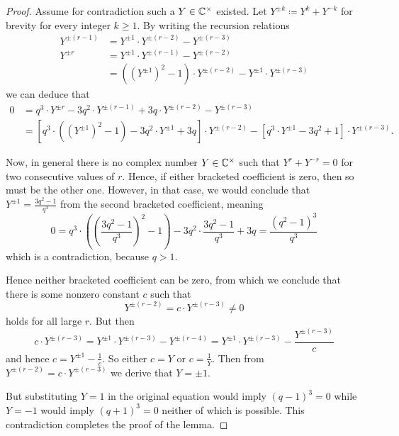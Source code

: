 \begin{proof}
  Assume for contradiction such a $Y \in \mathbb C^\times$ existed.
  Let $Y^{\pm k} \coloneqq Y^k + Y^{-k}$ for brevity for every integer $k \ge 1$.
  By writing the recursion relations
  \begin{align*}
    Y^{\pm (r-1)} &= Y^{\pm 1} \cdot Y^{\pm (r-2)} - Y^{\pm (r-3)} \\
    Y^{\pm r} &= Y^{\pm 1} \cdot Y^{\pm (r-1)} - Y^{\pm (r-2)} \\
    &= ((Y^{\pm 1})^2 - 1) \cdot Y^{\pm (r-2)} - Y^{\pm 1} \cdot Y^{\pm (r-3)}
  \end{align*}
  we can deduce that
  \begin{align*}
    0 &= q^3 \cdot Y^{\pm r} - 3q^2 \cdot Y^{\pm (r-1)} + 3q \cdot Y^{\pm (r-2)} - Y^{\pm (r-3)} \\
    &= \left[ q^3 \cdot \left( (Y^{\pm 1})^2 - 1 \right)
      - 3q^2 \cdot Y^{\pm 1} + 3q \right] \cdot Y^{\pm (r-2)}
    - \left[ q^3 \cdot Y^{\pm 1} - 3q^2 + 1 \right] \cdot Y^{\pm (r-3)}.
  \end{align*}

  Now, in general there is no complex number $Y \in \mathbb C^\times$ such that
  $Y^r + Y^{-r} = 0$ for two consecutive values of $r$.
  Hence, if either bracketed coefficient is zero, then so must be the other one.
  However, in that case, we would conclude that
  $Y^{\pm 1} = \frac{3q^2-1}{q^3}$ from the second bracketed coefficient, meaning
  \[ 0 = q^3 \cdot \left( \left( \frac{3q^2-1}{q^3} \right)^2 - 1 \right)
    - 3q^2 \cdot \frac{3q^2-1}{q^3} + 3q = \frac{(q^2-1)^3}{q^3} \]
  which is a contradiction, because $q > 1$.

  Hence neither bracketed coefficient can be zero,
  from which we conclude that there is some nonzero constant $c$ such that
  \[ Y^{\pm (r-2)} = c \cdot Y^{\pm(r-3)} \neq 0 \]
  holds for all large $r$.
  But then
  \[ c \cdot Y^{\pm(r-3)}
    = Y^{\pm 1} \cdot Y^{\pm (r-3)} - Y^{\pm (r-4)}
    = Y^{\pm 1} \cdot Y^{\pm (r-3)} - \frac{Y^{\pm (r-3)}}{c} \]
  and hence $c = Y^{\pm 1} - \frac 1c$.
  So either $c = Y$ or $c = \frac 1Y$.
  Then from $Y^{\pm (r-2)} = c \cdot Y^{\pm(r-3)}$ we derive that $Y = \pm 1$.

  But substituting $Y = 1$ in the original equation would imply $(q-1)^3 = 0$
  while $Y = -1$ would imply $(q+1)^3 = 0$ neither of which is possible.
  This contradiction completes the proof of the lemma.
\end{proof}

